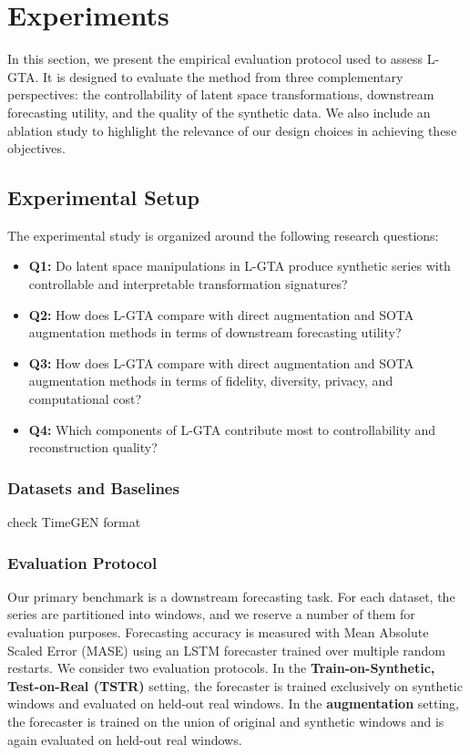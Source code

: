 

\section{Experiments}
\label{chap:results}

In this section, we present the empirical evaluation protocol used to assess L-GTA. It is designed to evaluate the method from three complementary perspectives: the controllability of latent space transformations, downstream forecasting utility, and the quality of the synthetic data. We also include an ablation study to highlight the relevance of our design choices in achieving these objectives.

\subsection{Experimental Setup}
\label{subsec:experimental_setup}

The experimental study is organized around the following research questions:
\begin{itemize}
    \item \textbf{Q1:} Do latent space manipulations in L-GTA produce synthetic series with controllable and interpretable transformation signatures?
    \item \textbf{Q2:} How does L-GTA compare with direct augmentation and SOTA augmentation methods in terms of downstream forecasting utility?
    \item \textbf{Q3:} How does L-GTA compare with direct augmentation and SOTA augmentation methods in terms of fidelity, diversity, privacy, and computational cost?
    \item \textbf{Q4:} Which components of L-GTA contribute most to controllability and reconstruction quality?
\end{itemize}

\subsubsection{Datasets and Baselines}

check TimeGEN format

\subsubsection{Evaluation Protocol}

Our primary benchmark is a downstream forecasting task. For each dataset, the series are partitioned into windows, and we reserve a number of them for evaluation purposes. Forecasting accuracy is measured with Mean Absolute Scaled Error (MASE) using an LSTM forecaster trained over multiple random restarts. We consider two evaluation protocols. In the \textbf{Train-on-Synthetic, Test-on-Real (TSTR)} setting, the forecaster is trained exclusively on synthetic windows and evaluated on held-out real windows. In the \textbf{augmentation} setting, the forecaster is trained on the union of original and synthetic windows and is again evaluated on held-out real windows.

